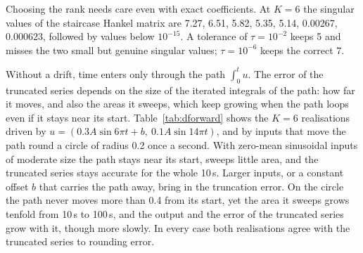 \documentclass[11pt,a4paper]{article}
\theoremstyle{remark}
\begin{document}
Choosing the rank needs care even with exact coefficients.
At $K=6$ the singular values of the staircase Hankel matrix are 7.27, 6.51, 5.82, 5.35, 5.14, 0.00267, 0.000623, followed by values below $10^{-15}$.
A tolerance of $\tau=10^{-2}$ keeps 5 and misses the two small but genuine singular values; $\tau=10^{-6}$ keeps the correct 7.

\begin{table}[t]\centering\small
\caption{Sizes of the realisations of the driftless Duffing series truncated at order $K$, with the same columns as Table~\ref{tab:dims}.}\label{tab:ddims}
\end{table}

Without a drift, time enters only through the path $\int_0^tu$.
The error of the truncated series depends on the size of the iterated integrals of the path: how far it moves, and also the areas it sweeps, which keep growing when the path loops even if it stays near its start.
Table~\ref{tab:dforward} shows the $K=6$ realisations driven by $u=(0.3A\sin 6\pi t+b,\ 0.1A\sin 14\pi t)$, and by inputs that move the path round a circle of radius 0.2 once a second.
With zero-mean sinusoidal inputs of moderate size the path stays near its start, sweeps little area, and the truncated series stays accurate for the whole 10\,s.
Larger inputs, or a constant offset $b$ that carries the path away, bring in the truncation error.
On the circle the path never moves more than 0.4 from its start, yet the area it sweeps grows tenfold from 10\,s to 100\,s, and the output and the error of the truncated series grow with it, though more slowly.
In every case both realisations agree with the truncated series to rounding error.
\end{document}
